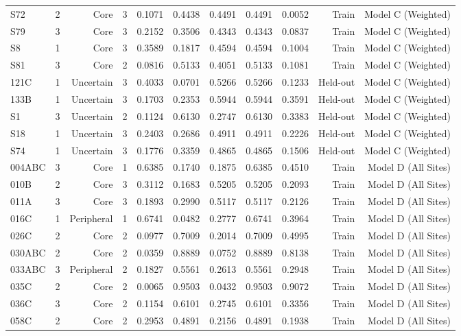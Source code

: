 {\begin{longtable}{lrrrrrrrrrr}
  S72 & 2 & Core & 3 & 0.1071 & 0.4438 & 0.4491 & 0.4491 & 0.0052 & Train & Model C (Weighted) \\
  S79 & 3 & Core & 3 & 0.2152 & 0.3506 & 0.4343 & 0.4343 & 0.0837 & Train & Model C (Weighted) \\
  S8 & 1 & Core & 3 & 0.3589 & 0.1817 & 0.4594 & 0.4594 & 0.1004 & Train & Model C (Weighted) \\
  S81 & 3 & Core & 2 & 0.0816 & 0.5133 & 0.4051 & 0.5133 & 0.1081 & Train & Model C (Weighted) \\
  121C & 1 & Uncertain & 3 & 0.4033 & 0.0701 & 0.5266 & 0.5266 & 0.1233 & Held-out & Model C (Weighted) \\
  133B & 1 & Uncertain & 3 & 0.1703 & 0.2353 & 0.5944 & 0.5944 & 0.3591 & Held-out & Model C (Weighted) \\
  S1 & 3 & Uncertain & 2 & 0.1124 & 0.6130 & 0.2747 & 0.6130 & 0.3383 & Held-out & Model C (Weighted) \\
  S18 & 1 & Uncertain & 3 & 0.2403 & 0.2686 & 0.4911 & 0.4911 & 0.2226 & Held-out & Model C (Weighted) \\
  S74 & 1 & Uncertain & 3 & 0.1776 & 0.3359 & 0.4865 & 0.4865 & 0.1506 & Held-out & Model C (Weighted) \\
  004ABC & 3 & Core & 1 & 0.6385 & 0.1740 & 0.1875 & 0.6385 & 0.4510 & Train & Model D (All Sites) \\
  010B & 2 & Core & 3 & 0.3112 & 0.1683 & 0.5205 & 0.5205 & 0.2093 & Train & Model D (All Sites) \\
  011A & 3 & Core & 3 & 0.1893 & 0.2990 & 0.5117 & 0.5117 & 0.2126 & Train & Model D (All Sites) \\
  016C & 1 & Peripheral & 1 & 0.6741 & 0.0482 & 0.2777 & 0.6741 & 0.3964 & Train & Model D (All Sites) \\
  026C & 2 & Core & 2 & 0.0977 & 0.7009 & 0.2014 & 0.7009 & 0.4995 & Train & Model D (All Sites) \\
  030ABC & 2 & Core & 2 & 0.0359 & 0.8889 & 0.0752 & 0.8889 & 0.8138 & Train & Model D (All Sites) \\
  033ABC & 3 & Peripheral & 2 & 0.1827 & 0.5561 & 0.2613 & 0.5561 & 0.2948 & Train & Model D (All Sites) \\
  035C & 2 & Core & 2 & 0.0065 & 0.9503 & 0.0432 & 0.9503 & 0.9072 & Train & Model D (All Sites) \\
  036C & 3 & Core & 2 & 0.1154 & 0.6101 & 0.2745 & 0.6101 & 0.3356 & Train & Model D (All Sites) \\
  058C & 2 & Core & 2 & 0.2953 & 0.4891 & 0.2156 & 0.4891 & 0.1938 & Train & Model D (All Sites) \\

\end{longtable}}
